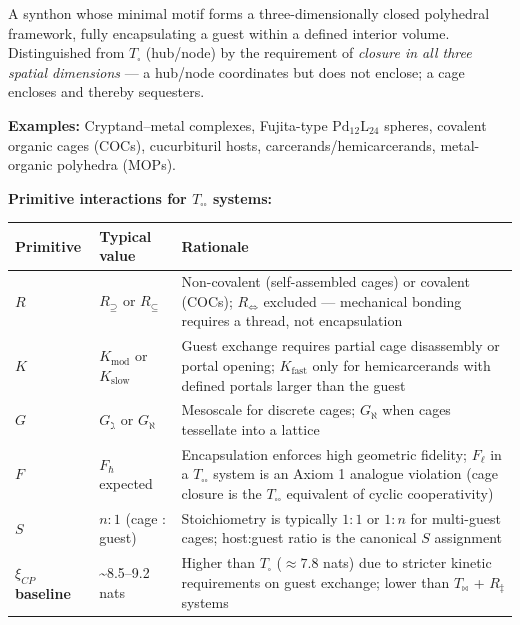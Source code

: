 \documentclass[12pt,a4paper]{article}
\begin{document}
A synthon whose minimal motif forms a three-dimensionally closed polyhedral framework, fully encapsulating a guest within a defined interior volume. Distinguished from $T_{\square}$ (hub/node) by the requirement of \emph{closure in all three spatial dimensions} --- a hub/node coordinates but does not enclose; a cage encloses and thereby sequesters.

\textbf{Examples:} Cryptand--metal complexes, Fujita-type $\text{Pd}_{12}\text{L}_{24}$ spheres, covalent organic cages (COCs), cucurbituril hosts, carcerands/hemicarcerands, metal-organic polyhedra (MOPs).

\textbf{Primitive interactions for $T_{\square\square}$ systems:}

\begin{table}[htbp]
\centering
\small
{}
\begin{tabularx}{\textwidth}{>{\centering\arraybackslash}X >{\centering\arraybackslash}X >{\centering\arraybackslash}X}
\toprule
\rowcolor{gray!25}\textbf{Primitive} & \textbf{Typical value} & \textbf{Rationale} \\
\midrule
\rowcolors{1}{white}{gray!10}
\textbf{$R$} & $R_{\supseteq}$ or $R_{\subseteq}$ & Non-covalent (self-assembled cages) or covalent (COCs); $R_{\Leftrightarrow}$ excluded --- mechanical bonding requires a thread, not encapsulation \\
\textbf{$K$} & $K_{\text{mod}}$ or $K_{\text{slow}}$ & Guest exchange requires partial cage disassembly or portal opening; $K_{\text{fast}}$ only for hemicarcerands with defined portals larger than the guest \\
\textbf{$G$} & $G_{\gimel}$ or $G_{\aleph}$ & Mesoscale for discrete cages; $G_{\aleph}$ when cages tessellate into a lattice \\
\textbf{$F$} & $F_{\hbar}$ expected & Encapsulation enforces high geometric fidelity; $F_{\ell}$ in a $T_{\square\square}$ system is an Axiom 1 analogue violation (cage closure is the $T_{\square\square}$ equivalent of cyclic cooperativity) \\
\textbf{$S$} & $n{:}1$ (cage : guest) & Stoichiometry is typically $1:1$ or $1:n$ for multi-guest cages; host:guest ratio is the canonical $S$ assignment \\
\textbf{$\xi_{CP}$ baseline} & \textasciitilde{}8.5--9.2 nats & Higher than $T_{\square}$ ($\approx 7.8$ nats) due to stricter kinetic requirements on guest exchange; lower than $T_{\bowtie}$ + $R_{\ddagger}$ systems \\
\bottomrule
\end{tabularx}
\end{table}
\end{document}
